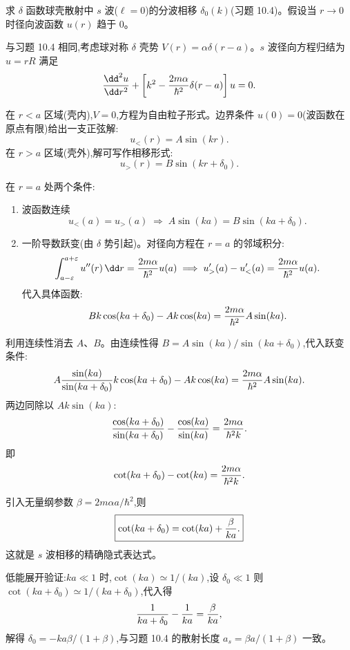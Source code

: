 \begin{question}
求 $\delta$ 函数球壳散射中 $s$ 波($\ell=0$)的分波相移 $\delta_0(k)$(习题 10.4)。假设当 $r\to0$ 时径向波函数 $u(r)$ 趋于 0。
\end{question}
\begin{solution}
与习题 10.4 相同,考虑球对称 $\delta$ 壳势 $V(r)=\alpha\delta(r-a)$。$s$ 波径向方程归结为 $u=rR$ 满足
\[
{\dd^2u\over\dd r^2}+\left[k^2-{2m\alpha\over\hbar^2}\delta(r-a)\right]u=0.
\]

在 $r<a$ 区域(壳内),$V=0$,方程为自由粒子形式。边界条件 $u(0)=0$(波函数在原点有限)给出一支正弦解:
\[
u_{<}(r)=A\sin(kr).
\]
在 $r>a$ 区域(壳外),解可写作相移形式:
\[
u_{>}(r)=B\sin(kr+\delta_0).
\]

在 $r=a$ 处两个条件:
\begin{enumerate}
\item 波函数连续
\[
u_{<}(a)=u_{>}(a)\;\Longrightarrow\;A\sin(ka)=B\sin(ka+\delta_0).
\]
\item 一阶导数跃变(由 $\delta$ 势引起)。对径向方程在 $r=a$ 的邻域积分:
\[
\int_{a-\varepsilon}^{a+\varepsilon}u''(r)\,\dd r={2m\alpha\over\hbar^2}u(a)
\;\Longrightarrow\;
u_{>}'(a)-u_{<}'(a)={2m\alpha\over\hbar^2}u(a).
\]
代入具体函数:
\[
Bk\cos(ka+\delta_0)-Ak\cos(ka)={2m\alpha\over\hbar^2}A\sin(ka).
\]
\end{enumerate}

利用连续性消去 $A$、$B$。由连续性得 $B=A\sin(ka)/\sin(ka+\delta_0)$,代入跃变条件:
\[
A{\sin(ka)\over\sin(ka+\delta_0)}k\cos(ka+\delta_0)-Ak\cos(ka)={2m\alpha\over\hbar^2}A\sin(ka).
\]
两边同除以 $Ak\sin(ka)$:
\[
{\cos(ka+\delta_0)\over\sin(ka+\delta_0)}-{\cos(ka)\over\sin(ka)}={2m\alpha\over\hbar^2k}.
\]
即
\[
\cot(ka+\delta_0)-\cot(ka)={2m\alpha\over\hbar^2k}.
\]

引入无量纲参数 $\beta=2m\alpha a/\hbar^2$,则
\[
\boxed{\cot(ka+\delta_0)=\cot(ka)+{\beta\over ka}.}
\]
这就是 $s$ 波相移的精确隐式表达式。

低能展开验证:$ka\ll1$ 时,$\cot(ka)\simeq 1/(ka)$,设 $\delta_0\ll1$ 则 $\cot(ka+\delta_0)\simeq 1/(ka+\delta_0)$,代入得
\[
{1\over ka+\delta_0}-{1\over ka}={\beta\over ka},
\]
解得 $\delta_0=-ka\beta/(1+\beta)$,与习题 10.4 的散射长度 $a_s=\beta a/(1+\beta)$ 一致。
\end{solution}

